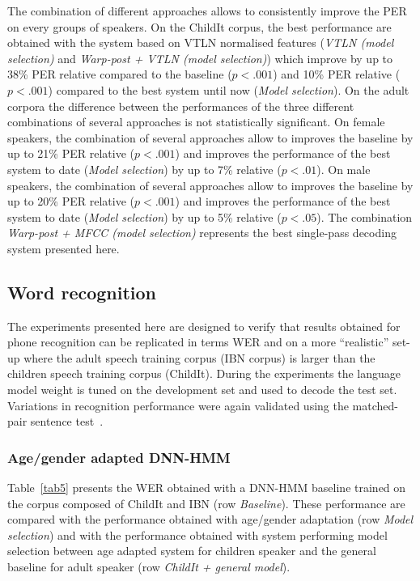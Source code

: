 \documentclass{nle}
\begin{document}
The combination of different approaches allows to consistently improve the PER on every groups of speakers. On the ChildIt corpus, the best performance are obtained with the system based on VTLN normalised features ({\em VTLN (model selection)} and {\em Warp-post + VTLN (model selection)}) which improve by up to 38\% PER relative compared to the baseline ($p  <.001$) and 10\% PER relative ($p  <.001$) compared to the best system until now ({\em Model selection}). On the adult corpora the difference between the performances of the three different combinations of several approaches is not statistically significant. On female speakers, the combination of several approaches allow to improves the baseline by up to 21\% PER relative ($p  <.001$) and improves the performance of the best system to date ({\em Model selection}) by up to 7\% relative ($p  <.01$). On male speakers, the combination of several approaches allow to improves the baseline by up to 20\% PER relative ($p  <.001$) and improves the performance of the best system to date ({\em Model selection}) by up to 5\% relative ($p  <.05$). The combination {\em Warp-post + MFCC (model selection)} represents the best single-pass decoding system presented here.


\subsection{Word recognition}
The experiments presented here are designed to verify that results obtained for phone recognition can be replicated  in terms WER and on a more ``realistic'' set-up where the adult speech training corpus (IBN corpus) is larger than the children speech training corpus (ChildIt). During the experiments the language model weight is tuned on the development set and used to decode the test set. Variations  in recognition performance were again validated using the matched-pair  sentence test~\citep{GilCox89}. 
\subsubsection{Age/gender adapted DNN-HMM}
Table~\ref{tab5} presents the WER obtained with a DNN-HMM  baseline trained on the corpus composed of ChildIt and IBN (row  {\em  Baseline}). These performance are compared with the performance obtained with age/gender adaptation (row {\em Model selection}) and with the performance obtained with system performing model selection between age adapted system for children speaker and the general baseline for adult speaker (row {\em ChildIt + general model}).
\end{document}
